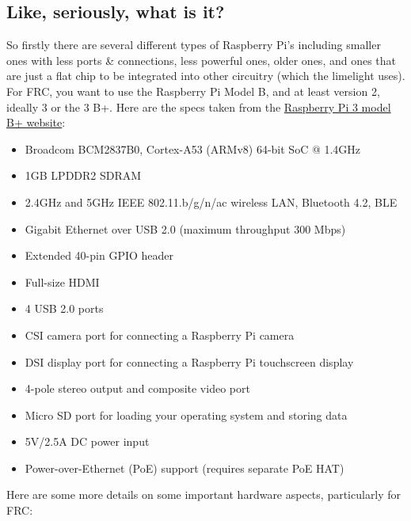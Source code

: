 \documentclass[11pt, titlepage]{article}
\begin{document}
\subsection{Like, seriously, what is it?}
\label{sec:WRPI_hardware}
So firstly there are several different types of Raspberry Pi's including smaller ones with less ports \& connections, less powerful ones, older ones, and ones that are just a flat chip to be integrated into other circuitry (which the limelight uses).
For FRC, you want to use the Raspberry Pi Model B, and at least version 2, ideally 3 or the 3 B+.
Here are the specs taken from the \href{www.raspberrypi.org/products/raspberry-pi-3-model-b-plus/}{Raspberry Pi 3 model B+ website}:
\begin{itemize}
	\item Broadcom BCM2837B0, Cortex-A53 (ARMv8) 64-bit SoC @ 1.4GHz
	\item 1GB LPDDR2 SDRAM
	\item 2.4GHz and 5GHz IEEE 802.11.b/g/n/ac wireless LAN, Bluetooth 4.2, BLE
	\item Gigabit Ethernet over USB 2.0 (maximum throughput 300 Mbps)
	\item Extended 40-pin GPIO header
	\item Full-size HDMI
	\item 4 USB 2.0 ports
	\item CSI camera port for connecting a Raspberry Pi camera
	\item DSI display port for connecting a Raspberry Pi touchscreen display
	\item 4-pole stereo output and composite video port
	\item Micro SD port for loading your operating system and storing data
	\item 5V/2.5A DC power input
	\item Power-over-Ethernet (PoE) support (requires separate PoE HAT)
\end{itemize}
Here are some more details on some important hardware aspects, particularly for FRC:
\end{document}
